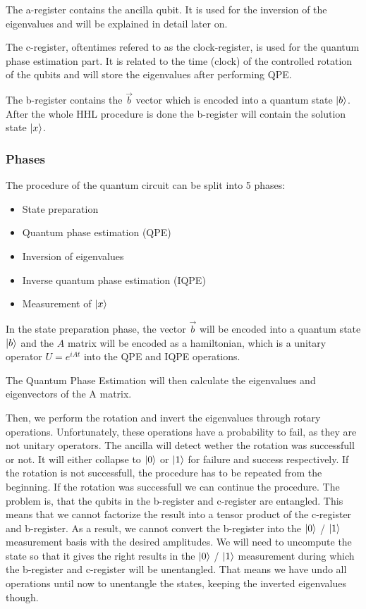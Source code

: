 The a-register contains the ancilla qubit. 
It is used for the inversion of the eigenvalues and will be explained in detail later on.

The c-register, oftentimes refered to as the clock-register, is used for the quantum phase estimation part. It is related to the time (clock) of the controlled rotation of the qubits and will store the eigenvalues after performing QPE.

The b-register contains the $\vec{b}$ vector which is encoded into a quantum state $\ket{b}$. 
After the whole HHL procedure is done the b-register will contain the solution state $\ket{x}$.



\subsubsection{Phases}
The procedure of the quantum circuit can be split into 5 phases:

\begin{itemize}
\item State preparation
\item Quantum phase estimation (QPE)
\item Inversion of eigenvalues
\item Inverse quantum phase estimation (IQPE)
\item Measurement of $\ket x$
\end{itemize}

In the state preparation phase, the vector $\vec{b}$ will be encoded into a quantum state $\ket{b}$ and the $A$ matrix will be encoded as a hamiltonian, which is a unitary operator
$U=e^{iAt}$ into the QPE and IQPE operations.

The Quantum Phase Estimation will then calculate the eigenvalues and eigenvectors of the A matrix.

Then, we perform the rotation and invert the eigenvalues through rotary operations. 
Unfortunately, these operations have a probability to fail, as they are not unitary operators.
The ancilla will detect wether the rotation was successfull or not.
It will either collapse to $\ket0$ or $\ket1$ for failure and success respectively.
If the rotation is not successfull, the procedure has to be repeated from the beginning. 
If the rotation was successfull we can continue the procedure. 
The problem is, that the qubits in the b-register and c-register are entangled. 
This means that we cannot factorize the result into a tensor product of the c-register and b-register.
As a result, we cannot convert the b-register into the $\ket 0$ / $\ket 1$ measurement basis with the desired amplitudes.
We will need to uncompute the state so that it gives the right results in the $\ket 0$ / $\ket 1$ measurement during which the b-register and c-register will be unentangled.
That means we have undo all operations until now to unentangle the states, keeping the inverted eigenvalues though.

